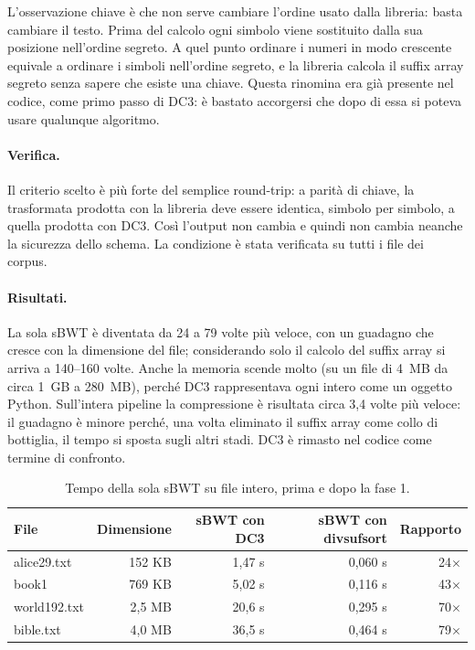 \documentclass[11pt,a4paper]{article}
\begin{document}
L'osservazione chiave è che non serve cambiare l'ordine usato dalla libreria: basta
cambiare il testo. Prima del calcolo ogni simbolo viene sostituito dalla sua posizione
nell'ordine segreto. A quel punto ordinare i numeri in modo crescente equivale a ordinare i
simboli nell'ordine segreto, e la libreria calcola il suffix array segreto senza sapere che
esiste una chiave. Questa rinomina era già presente nel codice, come primo passo di DC3:
è bastato accorgersi che dopo di essa si poteva usare qualunque algoritmo.

\paragraph{Verifica.} Il criterio scelto è più forte del semplice round-trip: a parità di
chiave, la trasformata prodotta con la libreria deve essere identica, simbolo per simbolo,
a quella prodotta con DC3. Così l'output non cambia e quindi non cambia neanche la
sicurezza dello schema. La condizione è stata verificata su tutti i file dei corpus.

\paragraph{Risultati.} La sola sBWT è diventata da 24 a 79 volte più veloce, con un
guadagno che cresce con la dimensione del file; considerando solo il calcolo del suffix
array si arriva a 140--160 volte. Anche la memoria scende molto (su un file di 4~MB da circa
1~GB a 280~MB), perché DC3 rappresentava ogni intero come un oggetto Python. Sull'intera
pipeline la compressione è risultata circa 3,4 volte più veloce: il guadagno è minore
perché, una volta eliminato il suffix array come collo di bottiglia, il tempo si sposta
sugli altri stadi. DC3 è rimasto nel codice come termine di confronto.

\begin{table}[h]
\centering
\begin{tabular}{lrrrr}
\toprule
File & Dimensione & sBWT con DC3 & sBWT con divsufsort & Rapporto \\
\midrule
alice29.txt & 152 KB & 1,47 s & 0,060 s & 24$\times$ \\
book1       & 769 KB & 5,02 s & 0,116 s & 43$\times$ \\
world192.txt& 2,5 MB & 20,6 s & 0,295 s & 70$\times$ \\
bible.txt   & 4,0 MB & 36,5 s & 0,464 s & 79$\times$ \\
\bottomrule
\end{tabular}
\caption{Tempo della sola sBWT su file intero, prima e dopo la fase 1.}
\end{table}
\end{document}
